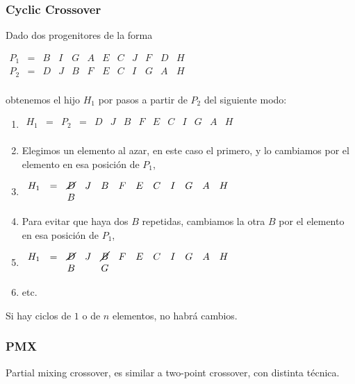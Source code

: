 \documentclass[10pt,a4paper]{article}
\begin{document}
\subsubsection*{Cyclic Crossover}

Dado dos progenitores de la forma

\begin{center}
$\begin{array}{cccccccccccc} P_1 &= &B&I&G&A&E&C&J&F&D&H\\ P_2 &= &D&J&B&F&E&C&I&G&A&H\\ \end{array}$
\end{center}

obtenemos el hijo $H_1$ por pasos a partir de $P_2$ del siguiente modo:

\begin{enumerate}

	\item $ \begin{array}{cccccccccccccc} H_1 &= &P_2 &=&D&J&B&F&E&C&I&G&A&H\\ \end{array}$
	\item Elegimos un elemento al azar, en este caso el primero, y lo cambiamos por el elemento en esa posición de $P_1 $,
	\item $ \begin{array}{cccccccccccc} H_1 &=&\cancel{D}&J&B&F&E&C&I&G&A&H\\ & & B &&&&&&&&& \end{array}$
	\item Para evitar que haya dos $B$ repetidas, cambiamos la otra $B$ por el elemento en esa posición de $P_1$,
	\item $ \begin{array}{cccccccccccc} H_1 &=&\cancel{D}&J&\cancel{B}&F&E&C&I&G&A&H\\ & & B &&G&&&&&&& \end{array}$
	\item etc.
\end{enumerate}

Si hay ciclos de $1$ o de $n$ elementos, no habrá cambios.

\subsubsection*{PMX}

Partial mixing crossover, es similar a two-point crossover, con distinta técnica.
\end{document}
